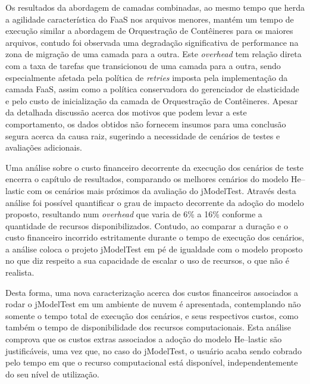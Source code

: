 \documentclass[english,brazilian]{UNISINOSmonografia} %
\begin{document}

Os resultados da abordagem de camadas combinadas, ao mesmo tempo que herda a agilidade característica do FaaS nos arquivos menores, mantém um tempo de execução similar a abordagem de Orquestração de Contêineres para os maiores arquivos, contudo foi observada uma degradação significativa de performance na zona de migração de uma camada para a outra.
%
Este \textit{overhead} tem relação direta com a taxa de tarefas que transicionou de uma camada para a outra, sendo especialmente afetada pela política de \textit{retries} imposta pela implementação da camada FaaS, assim como a política conservadora do gerenciador de elasticidade e pelo custo de inicialização da camada de Orquestração de Contêineres.
%
Apesar da detalhada discussão acerca dos motivos que podem levar a este comportamento, os dados obtidos não fornecem insumos para uma conclusão segura acerca da causa raiz, sugerindo a necessidade de cenários de testes e avaliações adicionais.



Uma análise sobre o custo financeiro decorrente da execução dos cenários de teste encerra o capítulo de resultados, comparando os melhores cenários do modelo \textsf{He}--lastic com os cenários mais próximos da avaliação do jModelTest.
%
Através desta análise foi possível quantificar o grau de impacto decorrente da adoção do modelo proposto, resultando num \textit{overhead} que varia de 6\% a 16\% conforme a quantidade de recursos disponibilizados.
%
Contudo, ao comparar a duração e o custo financeiro incorrido estritamente durante o tempo de execução dos cenários, a análise coloca o projeto jModelTest em pé de igualdade com o modelo proposto no que diz respeito a sua capacidade de escalar o uso de recursos, o que não é realista.



Desta forma, uma nova caracterização acerca dos custos financeiros associados a rodar o jModelTest em um ambiente de nuvem é apresentada, contemplando não somente o tempo total de execução dos cenários, e seus respectivos custos, como também o tempo de disponibilidade dos recursos computacionais.
%
Esta análise comprova que os custos extras associados a adoção do modelo \textsf{He}--lastic são justificáveis, uma vez que, no caso do jModelTest, o usuário acaba sendo cobrado pelo tempo em que o recurso computacional está disponível, independentemente do seu nível de utilização.
%
\end{document}
